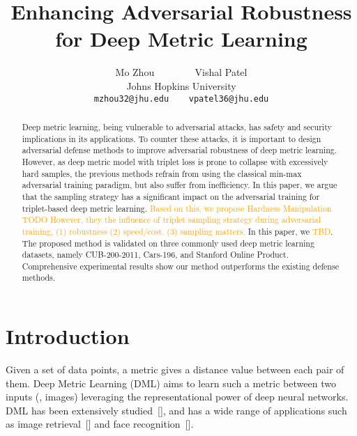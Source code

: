 \documentclass[10pt,twocolumn,letterpaper]{article}
\newcommand{\oo}[1]{\textcolor{orange}{#1}}
\begin{document}
\title{Enhancing Adversarial Robustness for Deep Metric Learning}

\author{Mo Zhou ~~~~~~~ Vishal Patel\\
Johns Hopkins University\\
{\tt\small mzhou32@jhu.edu ~~ vpatel36@jhu.edu}
}
\maketitle

\begin{abstract}
	Deep metric learning, being vulnerable to adversarial
	attacks, has safety and security implications in its applications.
	To counter these attacks, it is important to design adversarial
	defense methods to improve adversarial robustness of deep metric learning.
	However, as deep metric model with triplet loss is prone to collapse with
	excessively hard samples, the previous methods refrain from using the
	classical min-max adversarial training paradigm, but also suffer from
	inefficiency.
	In this paper, we argue that the sampling strategy has a significant
	impact on the adversarial training for triplet-based deep metric learning.
	\oo{
	Based on this, we propose Hardness Manipulation 
	TODO
	However, they the influence of triplet sampling strategy during
	adversarial training, 
	(1) robustness (2) speed/cost. (3) sampling matters.}
	In this paper, we \oo{TBD}.
	The proposed method is validated on three commonly
	used deep metric learning datasets, namely CUB-200-2011, Cars-196,
	and Stanford Online Product.
	Comprehensive experimental results show our method outperforms
	the existing defense methods.
\end{abstract}

\section{Introduction}
\label{sec:1}


Given a set of data points, a metric gives a distance value between each pair
of them.
%
Deep Metric Learning (DML) aims to learn such a metric between two inputs (\eg,
images) leveraging the representational power of deep neural networks.
%
DML has been extensively studied~[], and has a wide range of applications such
as image retrieval~[] and face recognition~[].
\end{document}
